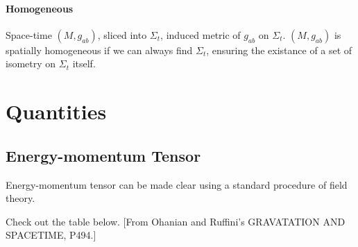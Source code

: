 \documentclass[12pt,a4paper]{book}
\begin{document}
\paragraph{Homogeneous} 
Space-time $(M,g_{ab})$, sliced into ${\Sigma_t}$, induced metric of $g_{ab}$ on $\Sigma_t$. $(M, g_{ab})$ is spatially homogeneous if we can always find ${\Sigma_t}$, ensuring the existance of a set of isometry on $\Sigma_t$ itself.








































\section{Quantities}

\subsection{Energy-momentum Tensor}

Energy-momentum tensor can be made clear using a standard procedure of field theory.

Check out the table below. [From Ohanian and Ruffini's GRAVATATION AND SPACETIME, P494.]
\end{document}
